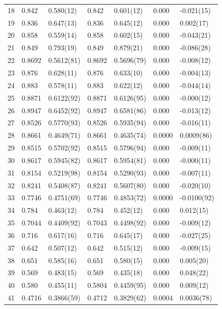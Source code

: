 \documentclass[aps, prc, tightenlines,superscriptaddress, letterpaper, amsmath, amssymb, preprintnumbers, floatfix, longbibliography, nofootinbib]{revtex4-2}
\begin{document}
\begin{table}[!htb]
{\begin{tabularx}{\textwidth}{| c || Y | Y | Y | Y | Y | Y |}
18	&	0.842	&	0.580(12)	&	0.842	&	0.601(12)	&	0.000	&	-0.021(15)	\\
19	&	0.836	&	0.647(13)	&	0.836	&	0.645(12)	&	0.000	&	0.002(17)	\\
20	&	0.858	&	0.559(14)	&	0.858	&	0.602(15)	&	0.000	&	-0.043(21)	\\
21	&	0.849	&	0.793(19)	&	0.849	&	0.879(21)	&	0.000	&	-0.086(28)	\\
22	&	0.8692	&	0.5612(81)	&	0.8692	&	0.5696(79)	&	0.000	&	-0.008(12)	\\
23	&	0.876	&	0.628(11)	&	0.876	&	0.633(10)	&	0.000	&	-0.004(13)	\\
24	&	0.883	&	0.578(11)	&	0.883	&	0.622(12)	&	0.000	&	-0.044(14)	\\
25	&	0.8871	&	0.6122(92)	&	0.8871	&	0.6126(95)	&	0.000	&	-0.000(12)	\\
26	&	0.8947	&	0.6452(92)	&	0.8947	&	0.6581(86)	&	0.000	&	-0.013(12)	\\
27	&	0.8526	&	0.5770(93)	&	0.8526	&	0.5935(94)	&	0.000	&	-0.016(11)	\\
28	&	0.8661	&	0.4649(71)	&	0.8661	&	0.4635(74)	&	0.0000	&	0.0009(86)	\\
29	&	0.8515	&	0.5702(92)	&	0.8515	&	0.5796(94)	&	0.000	&	-0.009(11)	\\
30	&	0.8617	&	0.5945(82)	&	0.8617	&	0.5954(81)	&	0.000	&	-0.000(11)	\\
31	&	0.8154	&	0.5219(98)	&	0.8154	&	0.5290(93)	&	0.000	&	-0.007(11)	\\
32	&	0.8241	&	0.5408(87)	&	0.8241	&	0.5607(80)	&	0.000	&	-0.020(10)	\\
33	&	0.7746	&	0.4751(69)	&	0.7746	&	0.4853(72)	&	0.0000	&	-0.0100(92)	\\
34	&	0.784	&	0.463(12)	&	0.784	&	0.452(12)	&	0.000	&	0.012(15)	\\
35	&	0.7044	&	0.4409(92)	&	0.7043	&	0.4498(92)	&	0.000	&	-0.009(12)	\\
36	&	0.716	&	0.617(16)	&	0.716	&	0.645(17)	&	0.000	&	-0.027(25)	\\
37	&	0.642	&	0.507(12)	&	0.642	&	0.515(12)	&	0.000	&	-0.009(15)	\\
38	&	0.651	&	0.585(16)	&	0.651	&	0.580(15)	&	0.000	&	0.005(20)	\\
39	&	0.569	&	0.483(15)	&	0.569	&	0.435(18)	&	0.000	&	0.048(22)	\\
40	&	0.580	&	0.455(11)	&	0.5804	&	0.4459(95)	&	0.000	&	0.009(12)	\\
41	&	0.4716	&	0.3866(59)	&	0.4712	&	0.3829(62)	&	0.0004	&	0.0036(78)	\\

\end{tabularx}}
\end{table}
\end{document}
